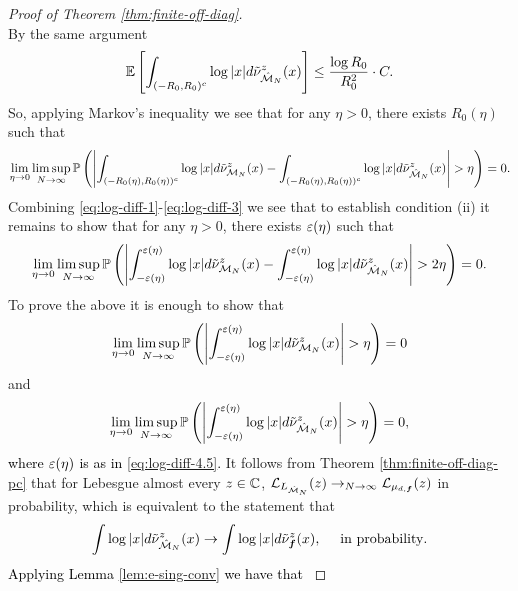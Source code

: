 \documentclass{amsart}
\numberwithin{equation}{section}
\def\corAB{}
\def\corABrev{\textcolor{black}}
\begin{document}
\begin{proof}[Proof of Theorem \ref{thm:finite-off-diag}]
\[\]
By the same argument
\begin{equation}\label{eq:log-near-infty-hat}
\mathbb E \left[\int_{(-R_0,R_0)^c} \log |x| d \tilde\nu_{\hat{\mathcal{M}}_N}^z(x)\right]  \le \frac{\log R_0}{R_0^2}  \cdot C.
\end{equation}
So, applying Markov's inequality we see that for any $\eta>0$, there exists $R_0(\eta)$ such that
\begin{equation}\label{eq:log-diff-3}
\lim_{\eta \to 0} \limsup_{N \to \infty} \mathbb P\left( \left| \int_{(-R_0(\eta),R_0(\eta))^c}  \log |x| d \tilde\nu_{\mathcal{M}_N}^z(x) - \int_{(-R_0(\eta),R_0(\eta))^c}  \log |x| d \tilde\nu_{\hat{\mathcal{M}}_N}^z(x)\right| > \eta\right) =0.
\end{equation}
Combining \eqref{eq:log-diff-1}-\eqref{eq:log-diff-3} we see that to establish condition (ii) it remains to show that for any $\eta >0$, there exists $\varepsilon(\eta)$ such that
\begin{equation}\label{eq:log-diff-4.5}
\lim_{\eta \to 0} \limsup_{N \to \infty} \mathbb P\left( \left| \int_{-\varepsilon(\eta)}^{\varepsilon(\eta)}  \log |x| d \tilde\nu_{\mathcal{M}_N}^z(x) - \int_{-\varepsilon(\eta)}^{\varepsilon(\eta)}  \log |x| d \tilde\nu_{\hat{\mathcal{M}}_N}^z(x)\right| > 2\eta\right) =0. 
\end{equation}
To prove the above it is enough to show that
\begin{equation}\label{eq:log-diff-4}
\lim_{\eta \to 0} \limsup_{N \to \infty} \mathbb P\left( \left| \int_{-\varepsilon(\eta)}^{\varepsilon(\eta)}  \log |x| d \tilde\nu_{\mathcal{M}_N}^z(x)\right| > \eta\right) =0
\end{equation}
and
\begin{equation}\label{eq:log-diff-5}
\lim_{\eta \to 0} \limsup_{N \to \infty} \mathbb P\left( \left| \int_{-\varepsilon(\eta)}^{\varepsilon(\eta)}  \log |x| d \tilde\nu_{\hat{\mathcal{M}}_N}^z(x)\right| > \eta\right) =0,
\end{equation}
\corABrev{where $\varepsilon(\eta)$ is as in \eqref{eq:log-diff-4.5}.}
It follows from
Theorem \ref{thm:finite-off-diag-pc} that for Lebesgue
almost every $z\in \mathbb{C}$,
$\LL_{L_{\hat\model_N}}(z)\to_{N\to\infty} \LL_{\mu_{d,{\bm f}}}\corABrev{(z)}$
in probability,
which is equivalent to the statement that
\begin{equation}\label{eq:log-pot-hat}
\int \log|x| d\tilde\nu^z_{\hat\model_N}(x) \to \int \log|x| d\corAB{\tilde\nu^z_{\bm f}}(x), \quad \text{ in probability}.
\end{equation}
\corABrev{Applying Lemma \ref{lem:e-sing-conv} we have that
}
\end{proof}
\end{document}
